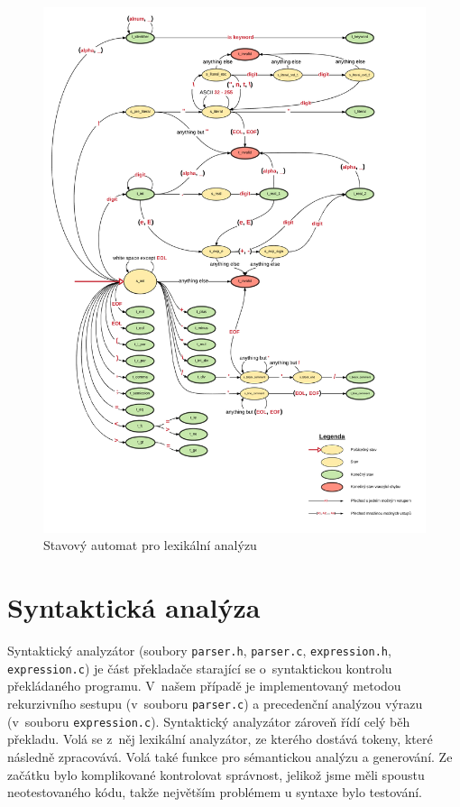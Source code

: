 \documentclass[11pt,a4paper]{article}
\begin{document}
\begin{figure}[H]
	
	\includegraphics[width=17cm]{png/FSM_diagram.png} 
	\caption{Stavový automat pro lexikální analýzu}

\end{figure}



\section{Syntaktická analýza}
Syntaktický analyzátor (soubory \verb|parser.h|, \verb|parser.c|, \verb|expression.h|, \verb|expression.c|) je část překladače starající se o~syntaktickou kontrolu překládaného programu. V~našem případě je implementovaný metodou rekurzivního sestupu (v~souboru \verb|parser.c|) a precedenční analýzou výrazu (v~souboru \verb|expression.c|). Syntaktický analyzátor zároveň řídí celý běh překladu. Volá se z~něj lexikální analyzátor, ze kterého dostává tokeny, které následně zpracovává. Volá také funkce pro sémantickou analýzu a generování. Ze začátku bylo komplikované kontrolovat správnost, jelikož jsme měli spoustu neotestovaného kódu, takže největším problémem u syntaxe bylo testování.
\end{document}
